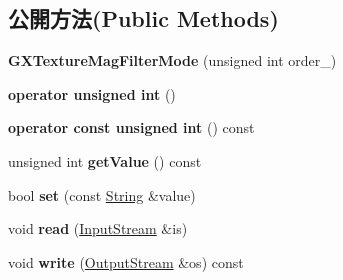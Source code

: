 \subsection*{公開方法(Public Methods)}
\begin{DoxyCompactItemize}
\item 
{\bfseries G\+X\+Texture\+Mag\+Filter\+Mode} (unsigned int order\+\_)\hypertarget{class_magnum_1_1_g_x_texture_mag_filter_mode_ab9aa4d986a6c408ffd8a4ee0d07196e3}{}\label{class_magnum_1_1_g_x_texture_mag_filter_mode_ab9aa4d986a6c408ffd8a4ee0d07196e3}

\item 
{\bfseries operator unsigned int} ()\hypertarget{class_magnum_1_1_g_x_texture_mag_filter_mode_a6b5e16a40982a03883c0672c32bbd5f3}{}\label{class_magnum_1_1_g_x_texture_mag_filter_mode_a6b5e16a40982a03883c0672c32bbd5f3}

\item 
{\bfseries operator const unsigned int} () const \hypertarget{class_magnum_1_1_g_x_texture_mag_filter_mode_af366751f6199f8782c09c692dec3f374}{}\label{class_magnum_1_1_g_x_texture_mag_filter_mode_af366751f6199f8782c09c692dec3f374}

\item 
unsigned int {\bfseries get\+Value} () const \hypertarget{class_magnum_1_1_g_x_texture_mag_filter_mode_a79b80c20b98fb2f92e40eb2b1f976afc}{}\label{class_magnum_1_1_g_x_texture_mag_filter_mode_a79b80c20b98fb2f92e40eb2b1f976afc}

\item 
bool {\bfseries set} (const \hyperlink{class_magnum_1_1_string}{String} \&value)\hypertarget{class_magnum_1_1_g_x_texture_mag_filter_mode_a4574cca06ac0cc8f99633bd9ed3903f1}{}\label{class_magnum_1_1_g_x_texture_mag_filter_mode_a4574cca06ac0cc8f99633bd9ed3903f1}

\item 
void {\bfseries read} (\hyperlink{class_magnum_1_1_input_stream}{Input\+Stream} \&is)\hypertarget{class_magnum_1_1_g_x_texture_mag_filter_mode_aa9abeea6d052eadac44099bdcb8d165a}{}\label{class_magnum_1_1_g_x_texture_mag_filter_mode_aa9abeea6d052eadac44099bdcb8d165a}

\item 
void {\bfseries write} (\hyperlink{class_magnum_1_1_output_stream}{Output\+Stream} \&os) const \hypertarget{class_magnum_1_1_g_x_texture_mag_filter_mode_a5bb068954e95d759a78afd1252861d88}{}\label{class_magnum_1_1_g_x_texture_mag_filter_mode_a5bb068954e95d759a78afd1252861d88}

\end{DoxyCompactItemize}
